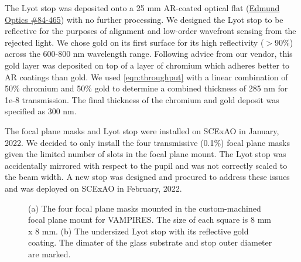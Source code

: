 \documentclass[]{spie}  %
\begin{document}
The Lyot stop was deposited onto a 25 mm AR-coated optical flat (\href{https://www.edmundoptics.com/p/25mm-dia-3mm-thick-nir-i-coated-lambda10-fused-silica-window/27561/}{Edmund Optics \#84-465}) with no further processing. We designed the Lyot stop to be reflective for the purposes of alignment and low-order wavefront sensing from the rejected light. We chose gold on its first surface for its high reflectivity ($>$90\%) across the 600-800 nm wavelength range. Following advice from our vendor, this gold layer was deposited on top of a layer of chromium which adheres better to AR coatings than gold. We used \autoref{eqn:throughput} with a linear combination of 50\% chromium and 50\% gold to determine a combined thickness of 285 nm for 1e-8 transmission. The final thickness of the chromium and gold deposit was specified as 300 nm.

The focal plane masks and Lyot stop were installed on SCExAO in January, 2022. We decided to only install the four  transmissive (0.1\%) focal plane masks given the limited number of slots in the focal plane mount. The Lyot stop was accidentally mirrored with respect to the pupil and was not correctly scaled to the beam width. A new stop was designed and procured to address these issues and was deployed on SCExAO in February, 2022.

\begin{figure}
   \centering
   \hspace{0.5in}
   \caption{(a) The four focal plane masks mounted in the custom-machined focal plane mount for VAMPIRES. The size of each square is 8 mm x 8 mm. (b) The undersized Lyot stop with its reflective gold coating. The dimater of the glass substrate and stop outer diameter are marked.}\label{fig:optics}
\end{figure}
\end{document}
